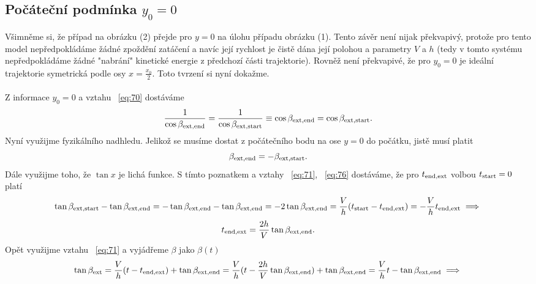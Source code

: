 \documentclass[reqno, a4paper]{amsart}
\begin{document}
\subsection*{Počáteční podmínka $y_0=0$}
Všimněme si, že případ na obrázku (2) přejde pro $y=0$ na úlohu případu obrázku (1). Tento závěr není nijak překvapivý, protože pro tento model nepředpokládáme žádné zpoždění zatáčení a navíc její rychlost je čistě dána její polohou a parametry $V$ a $h$ (tedy v tomto systému nepředpokládáme žádné "nabrání" kinetické energie z předchozí části trajektorie). Rovněž není překvapivé, že pro $y_0=0$ je ideální trajektorie symetrická podle osy $x=\frac{x_0}{2}$. Toto tvrzení si nyní dokažme.\\
\\

Z informace $y_0=0$ a vztahu ~\eqref{eq:70} dostáváme
\begin{equation}
	\label{eq:75}
	\frac{1}{\cos\beta_{\mathrm{ext}, \mathrm{end}}} = \frac{1}{\cos\beta_{\mathrm{ext}, \mathrm{start}}} \equiv  \cos\beta_{\mathrm{ext}, \mathrm{end}} = \cos\beta_{\mathrm{ext}, \mathrm{start}}.
\end{equation}
Nyní využijme fyzikálního nadhledu. Jelikož se musíme dostat z počátečního bodu na ose $y=0$ do počátku, jistě musí platit
\begin{equation}
	\label{eq:76}
	\beta_{\mathrm{ext}, \mathrm{end}}=-\beta_{\mathrm{ext}, \mathrm{start}}.
\end{equation}
Dále využijme toho, že $\tan x$ je lichá funkce. S tímto poznatkem a vztahy ~\eqref{eq:71}, ~\eqref{eq:76} dostáváme, že pro $t_{\mathrm{end}, \mathrm{ext}}$ volbou $t_{\mathrm{start}}=0$ platí
\begin{equation*}
	\tan \beta_{\mathrm{ext}, \mathrm{start}} -  \tan \beta_{\mathrm{ext}, \mathrm{end}} = -\tan \beta_{\mathrm{ext}, \mathrm{end}} -  \tan \beta_{\mathrm{ext}, \mathrm{end}}=-2\tan \beta_{\mathrm{ext}, \mathrm{end}}
	=\frac{V}{h} (t_{\mathrm{start}} - t_{\mathrm{end}, \mathrm{ext}})=-\frac{V}{h} t_{\mathrm{end}, \mathrm{ext}} \implies
\end{equation*}
\begin{equation}
	\label{eq:77}
	t_{\mathrm{end}, \mathrm{ext}}=\frac{2h}{V}\tan \beta_{\mathrm{ext}, \mathrm{end}}.
\end{equation}
Opět využijme vztahu ~\eqref{eq:71} a vyjádřeme $\beta$ jako $\beta (t)$
\begin{equation*}
	\tan \beta_{\mathrm{ext}} = \frac{V}{h}(t-t_{\mathrm{end}, \mathrm{ext}})+\tan \beta_{\mathrm{ext}, \mathrm{end}}=\frac{V}{h}(t-\frac{2h}{V}\tan \beta_{\mathrm{ext}, \mathrm{end}})+\tan \beta_{\mathrm{ext}, \mathrm{end}}=\frac{V}{h}t - \tan \beta_{\mathrm{ext}, \mathrm{end}} \implies
\end{equation*}
\end{document}
